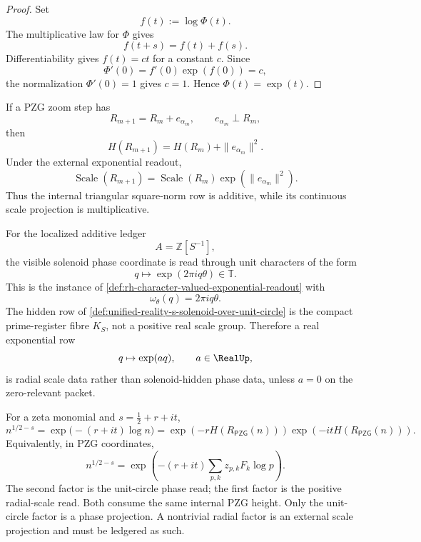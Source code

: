 \begin{proof}
Set
$$
f(t):=\log\Phi(t).
$$
The multiplicative law for $\Phi$ gives
$$
f(t+s)=f(t)+f(s).
$$
Differentiability gives $f(t)=ct$ for a constant $c$. Since
$$
\Phi'(0)=f'(0)\exp(f(0))=c,
$$
the normalization $\Phi'(0)=1$ gives $c=1$. Hence
$\Phi(t)=\exp(t)$.
\end{proof}

\begin{principle}
\label{prin:rh-pythagorean-addition-exponential-multiplication}
If a PZG zoom step has
$$
R_{m+1}=R_m+e_{\alpha_m},
\qquad
e_{\alpha_m}\perp R_m,
$$
then
$$
H(R_{m+1})=H(R_m)+\|e_{\alpha_m}\|^2.
$$
Under the external exponential readout,
$$
\operatorname{Scale}(R_{m+1})
=
\operatorname{Scale}(R_m)\exp(\|e_{\alpha_m}\|^2).
$$
Thus the internal triangular square-norm row is additive, while its
continuous scale projection is multiplicative.
\end{principle}

\begin{principle}
\label{prin:rh-solenoid-exponential-readout-phase-valued}
For the localized additive ledger
$$
A=\mathbb Z[S^{-1}],
$$
the visible solenoid phase coordinate is read through unit characters of
the form
$$
q\mapsto\exp(2\pi i q\theta)\in\mathbb T.
$$
This is the instance of
\autoref{def:rh-character-valued-exponential-readout} with
$$
\omega_{\theta}(q)=2\pi i q\theta.
$$
The hidden row of
\autoref{def:unified-reality-s-solenoid-over-unit-circle} is the compact
prime-register fibre $K_S$, not a positive real scale group. Therefore a
real exponential row
$$
q\mapsto\exp(aq),
\qquad
a\in\RealUp,
$$
is radial scale data rather than solenoid-hidden phase data, unless
$a=0$ on the zero-relevant packet.
\end{principle}

\begin{principle}
\label{prin:rh-phase-radial-same-internal-height}
For a zeta monomial and $s=\frac12+r+it$,
$$
n^{1/2-s}
=
\exp\bigl(-(r+it)\log n\bigr)
=
\exp(-rH(R_{\mathsf{PZG}}(n)))
\exp(-itH(R_{\mathsf{PZG}}(n))).
$$
Equivalently, in PZG coordinates,
$$
n^{1/2-s}
=
\exp\left(
-(r+it)\sum_{p,k}z_{p,k}F_k\log p
\right).
$$
The second factor is the unit-circle phase read; the first factor is the
positive radial-scale read. Both consume the same internal PZG height.
Only the unit-circle factor is a phase projection. A nontrivial radial
factor is an external scale projection and must be ledgered as such.
\end{principle}

